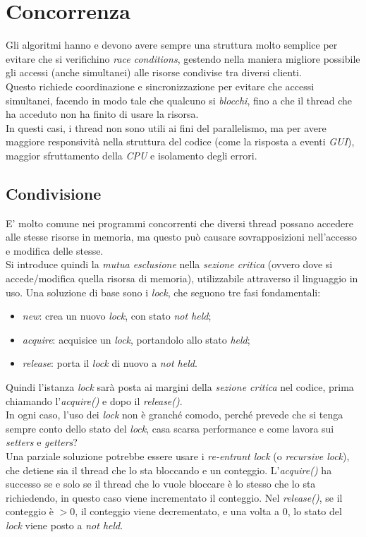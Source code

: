 \section{Concorrenza}
Gli algoritmi hanno e devono avere sempre una struttura molto semplice per evitare che si verifichino \textit{race conditions}, gestendo nella maniera migliore possibile gli accessi (anche simultanei) alle risorse condivise tra diversi clienti. \\
Questo richiede coordinazione e sincronizzazione per evitare che accessi simultanei, facendo in modo tale che qualcuno si \textit{blocchi}, fino a che il thread che ha acceduto non ha finito di usare la risorsa. \\
In questi casi, i thread non sono utili ai fini del parallelismo, ma per avere maggiore responsività nella struttura del codice (come la risposta a eventi \textit{GUI}), maggior sfruttamento della \textit{CPU} e isolamento degli errori. \\

\subsection{Condivisione}
E' molto comune nei programmi concorrenti che diversi thread possano accedere alle stesse risorse in memoria, ma questo può causare sovrapposizioni nell'accesso e modifica delle stesse. \\
Si introduce quindi la \textit{mutua esclusione} nella \textit{sezione critica} (ovvero dove si accede/modifica quella risorsa di memoria), utilizzabile attraverso il linguaggio in uso.
Una soluzione di base sono i \textit{lock}, che seguono tre fasi fondamentali:
\begin{itemize}
	\item \textit{new}: crea un nuovo \textit{lock}, con stato \textit{not held};
	\item \textit{acquire}: acquisice un \textit{lock}, portandolo allo stato \textit{held};
	\item \textit{release}: porta il \textit{lock} di nuovo a \textit{not held}.
\end{itemize}
Quindi l'istanza \textit{lock} sarà posta ai margini della \textit{sezione critica} nel codice, prima chiamando l'\textit{acquire()} e dopo il \textit{release()}. \\
In ogni caso, l'uso dei \textit{lock} non è granché comodo, perché prevede che si tenga sempre conto dello stato del \textit{lock}, casa scarsa performance e come lavora sui \textit{setters} e \textit{getters}? \\
Una parziale soluzione potrebbe essere usare i \textit{re-entrant lock} (o \textit{recursive lock}), che detiene sia il thread che lo sta bloccando e un conteggio. L'\textit{acquire()} ha successo se e solo se il thread che lo vuole bloccare è lo stesso che lo sta richiedendo, in questo caso viene incrementato il conteggio. Nel \textit{release()}, se il conteggio è $> 0$, il conteggio viene decrementato, e una volta a $0$, lo stato del \textit{lock} viene posto a \textit{not held}.

